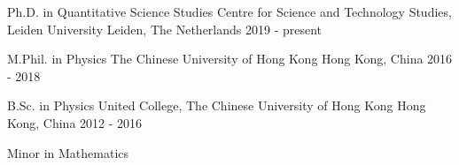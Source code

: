 

\begin{cventries}

  \cventry
    {Ph.D. in Quantitative Science Studies} %
    {Centre for Science and Technology Studies, Leiden University} %
    {Leiden, The Netherlands} %
    {2019 - present} %
    {}

  \cventry
    {M.Phil. in Physics} %
    {The Chinese University of Hong Kong} %
    {Hong Kong, China} %
    {2016 - 2018} %
    {}

  \cventry
    {B.Sc. in Physics} %
    {United College, The Chinese University of Hong Kong} %
    {Hong Kong, China} %
    {2012 - 2016} %
    {
      \begin{cvitems} %
        \item {Minor in Mathematics}
      \end{cvitems}
    }

\end{cventries}
